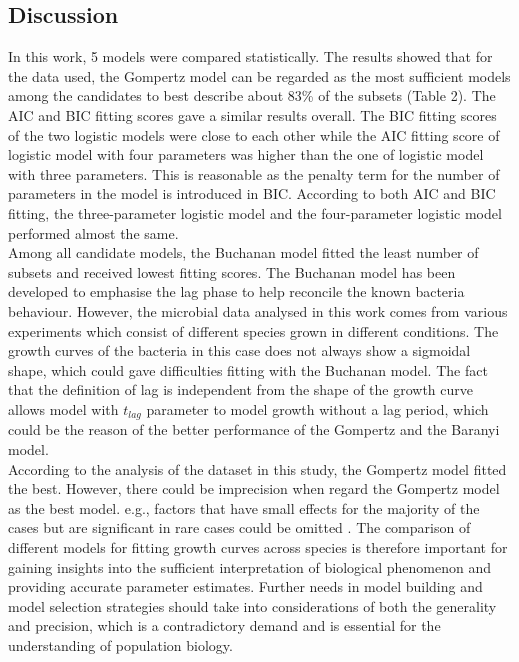 \documentclass[a4paper,11pt]{article}
\theoremstyle{definition}
\begin{document}
\begin{linenumbers}
\section{Discussion}
In this work, 5 models were compared statistically. The results showed that for the data used, the Gompertz model can be regarded as the most sufficient models among the candidates to best describe about 83\% of the subsets (Table 2). The AIC and BIC fitting scores gave a similar results overall. The BIC fitting scores of the two logistic models were close to each other while the AIC fitting score of logistic model with four parameters was higher than the one of logistic model with three parameters. This is reasonable as the penalty term for the number of parameters in the model is introduced in BIC. According to both AIC and BIC fitting, the three-parameter logistic model and the four-parameter logistic model performed almost the same.\\
Among all candidate models, the Buchanan model fitted the least number of subsets and received lowest fitting scores. The Buchanan model has been developed to emphasise the lag phase to help reconcile the known bacteria behaviour. However, the microbial data analysed in this work comes from various experiments which consist of different species grown in different conditions. The growth curves of the bacteria in this case does not always show a sigmoidal shape, which could gave difficulties fitting with the Buchanan model. The fact that the definition of lag is independent from the shape of the growth curve allows model with $t_{lag}$ parameter to model growth without a lag period, which could be the reason of the better performance of the Gompertz and the Baranyi model. \\
According to the analysis of the dataset in this study, the Gompertz model fitted the best. However, there could be imprecision when regard the Gompertz model as the best model. e.g., factors that have small effects for the majority of the cases but are significant in rare cases could be omitted \citep{levins1966strategy}. The comparison of different models for fitting growth curves across species is therefore important for gaining insights into the sufficient interpretation of biological phenomenon and providing accurate parameter estimates. Further needs in model building and model selection strategies should take into considerations of both the generality and precision, which is a contradictory demand and is essential for the understanding of population biology.

\end{linenumbers}


  
\end{document}
